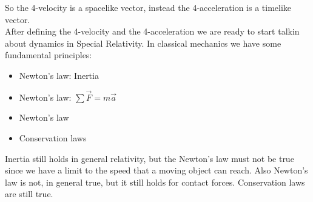So the 4-velocity is a spacelike vector, instead the 4-acceleration is a timelike vector.\\
After defining the 4-velocity and the 4-acceleration we are ready to start talkin about dynamics in Special Relativity. In classical mechanics we have some fundamental principles:
\begin{itemize}
  \item Newton's  law: Inertia
  \item Newton's  law: $\sum \vec{F} = m\vec{a}$
  \item Newton's  law
  \item Conservation laws
\end{itemize}
Inertia still holds in general relativity, but the Newton's  law must not be true since we have a limit to the speed that a moving object can reach. Also Newton's  law is not, in general true, but it still holds for contact forces. Conservation laws are still true.
